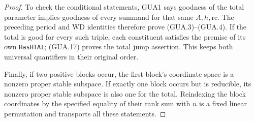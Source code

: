 \begin{proof}
To check the conditional statements, GUA1 says goodness
of the total parameter implies goodness of every
summand for that same $A,h,\mathrm{rc}$.  The preceding
period and WD identities therefore prove (GUA.3)--(GUA.4).
If the total is good for every such triple, each constituent
satisfies the premise of its own \texttt{HasHTAt};
(GUA.17) proves the total jump assertion.  This keeps
both universal quantifiers in their original order.

Finally, if two positive blocks occur, the first block's
coordinate space is a nonzero proper stable subspace.
If exactly one block occurs but is reducible, its
nonzero proper stable subspace is also one for the total.
Reindexing the block coordinates by the specified
equality of their rank sum with $n$ is a fixed linear
permutation and transports all these statements.
\end{proof}

